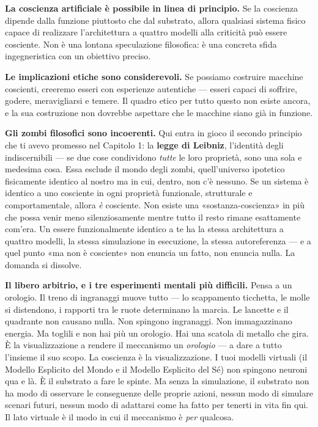 \documentclass[11pt, twoside, openright]{book}
\begin{document}
\textbf{La coscienza artificiale è possibile in linea di principio.} Se la coscienza dipende dalla funzione piuttosto che dal substrato, allora qualsiasi sistema fisico capace di realizzare l'architettura a quattro modelli alla criticità può essere cosciente. Non è una lontana speculazione filosofica: è una concreta sfida ingegneristica con un obiettivo preciso.

\textbf{Le implicazioni etiche sono considerevoli.} Se possiamo costruire macchine coscienti, creeremo esseri con esperienze autentiche --- esseri capaci di soffrire, godere, meravigliarsi e temere. Il quadro etico per tutto questo non esiste ancora, e la sua costruzione non dovrebbe aspettare che le macchine siano già in funzione.

\textbf{Gli zombi filosofici sono incoerenti.} Qui entra in gioco il secondo principio che ti avevo promesso nel Capitolo 1: la \textbf{legge di Leibniz}, l'identità degli indiscernibili --- se due cose condividono \textit{tutte} le loro proprietà, sono una sola e medesima cosa. Essa esclude il mondo degli zombi, quell'universo ipotetico fisicamente identico al nostro ma in cui, dentro, non c'è nessuno. Se un sistema è identico a uno cosciente in ogni proprietà funzionale, strutturale e comportamentale, allora \textit{è} cosciente. Non esiste una «sostanza-coscienza» in più che possa venir meno silenziosamente mentre tutto il resto rimane esattamente com'era. Un essere funzionalmente identico a te ha la stessa architettura a quattro modelli, la stessa simulazione in esecuzione, la stessa autoreferenza --- e a quel punto «ma non è cosciente» non enuncia un fatto, non enuncia nulla. La domanda si dissolve.

\textbf{Il libero arbitrio, e i tre esperimenti mentali più difficili.} Pensa a un orologio. Il treno di ingranaggi muove tutto --- lo scappamento ticchetta, le molle si distendono, i rapporti tra le ruote determinano la marcia. Le lancette e il quadrante non causano nulla. Non spingono ingranaggi. Non immagazzinano energia. Ma toglili e non hai più un orologio. Hai una scatola di metallo che gira. È la visualizzazione a rendere il meccanismo un \textit{orologio} --- a dare a tutto l'insieme il suo scopo. La coscienza è la visualizzazione. I tuoi modelli virtuali (il Modello Esplicito del Mondo e il Modello Esplicito del Sé) non spingono neuroni qua e là. È il substrato a fare le spinte. Ma senza la simulazione, il substrato non ha modo di osservare le conseguenze delle proprie azioni, nessun modo di simulare scenari futuri, nessun modo di adattarsi come ha fatto per tenerti in vita fin qui. Il lato virtuale è il modo in cui il meccanismo è \textit{per} qualcosa.
\end{document}
